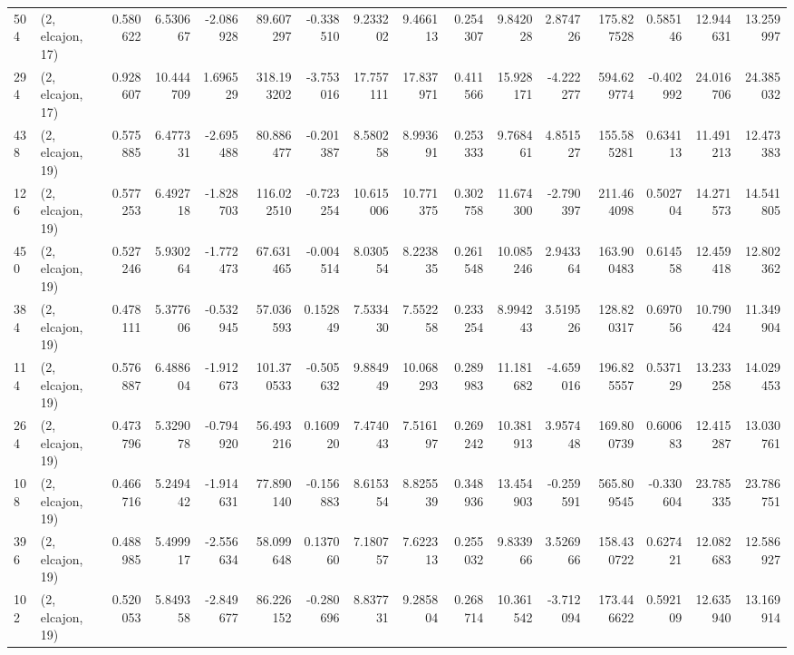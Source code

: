 \begin{tabular}{llrrrrrrrrrrrrrr}
504 &  (2, elcajon, 17) &   0.580622 &   6.530667 &  -2.086928 &    89.607297 &  -0.338510 &   9.233202 &   9.466113 &  0.254307 &   9.842028 &   2.874726 &   175.827528 &  0.585146 &  12.944631 &  13.259997 \\
294 &  (2, elcajon, 17) &   0.928607 &  10.444709 &   1.696529 &   318.193202 &  -3.753016 &  17.757111 &  17.837971 &  0.411566 &  15.928171 &  -4.222277 &   594.629774 & -0.402992 &  24.016706 &  24.385032 \\
438 &  (2, elcajon, 19) &   0.575885 &   6.477331 &  -2.695488 &    80.886477 &  -0.201387 &   8.580258 &   8.993691 &  0.253333 &   9.768461 &   4.851527 &   155.585281 &  0.634113 &  11.491213 &  12.473383 \\
126 &  (2, elcajon, 19) &   0.577253 &   6.492718 &  -1.828703 &   116.022510 &  -0.723254 &  10.615006 &  10.771375 &  0.302758 &  11.674300 &  -2.790397 &   211.464098 &  0.502704 &  14.271573 &  14.541805 \\
450 &  (2, elcajon, 19) &   0.527246 &   5.930264 &  -1.772473 &    67.631465 &  -0.004514 &   8.030554 &   8.223835 &  0.261548 &  10.085246 &   2.943364 &   163.900483 &  0.614558 &  12.459418 &  12.802362 \\
384 &  (2, elcajon, 19) &   0.478111 &   5.377606 &  -0.532945 &    57.036593 &   0.152849 &   7.533430 &   7.552258 &  0.233254 &   8.994243 &   3.519526 &   128.820317 &  0.697056 &  10.790424 &  11.349904 \\
114 &  (2, elcajon, 19) &   0.576887 &   6.488604 &  -1.912673 &   101.370533 &  -0.505632 &   9.884949 &  10.068293 &  0.289983 &  11.181682 &  -4.659016 &   196.825557 &  0.537129 &  13.233258 &  14.029453 \\
264 &  (2, elcajon, 19) &   0.473796 &   5.329078 &  -0.794920 &    56.493216 &   0.160920 &   7.474043 &   7.516197 &  0.269242 &  10.381913 &   3.957448 &   169.800739 &  0.600683 &  12.415287 &  13.030761 \\
108 &  (2, elcajon, 19) &   0.466716 &   5.249442 &  -1.914631 &    77.890140 &  -0.156883 &   8.615354 &   8.825539 &  0.348936 &  13.454903 &  -0.259591 &   565.809545 & -0.330604 &  23.785335 &  23.786751 \\
396 &  (2, elcajon, 19) &   0.488985 &   5.499917 &  -2.556634 &    58.099648 &   0.137060 &   7.180757 &   7.622313 &  0.255032 &   9.833966 &   3.526966 &   158.430722 &  0.627421 &  12.082683 &  12.586927 \\
102 &  (2, elcajon, 19) &   0.520053 &   5.849358 &  -2.849677 &    86.226152 &  -0.280696 &   8.837731 &   9.285804 &  0.268714 &  10.361542 &  -3.712094 &   173.446622 &  0.592109 &  12.635940 &  13.169914 \\

\end{tabular}
